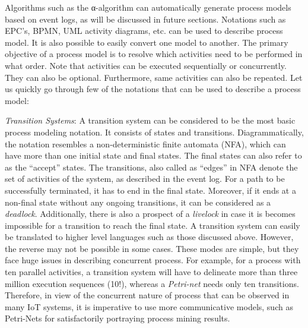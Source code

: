 Algorithms such as the α-algorithm can automatically generate process models based on event logs, as will be discussed in future sections. Notations such as EPC’s, BPMN, UML activity diagrams, etc. can be used to describe process model. It is also possible to easily convert one model to another. The primary objective of a process model is to resolve which activities need to be performed in what order. Note that activities can be executed sequentially or concurrently. They can also be optional. Furthermore, same activities can also be repeated. Let us quickly go through few of the notations that can be used to describe a process model\cite{VanderAalst2011}: 

\textit{Transition Systems}: A transition system can be considered to be the most basic process modeling notation. It consists of states and transitions. Diagrammatically, the notation resembles a non-deterministic finite automata (NFA), which can have more than one initial state and final states. The final states can also refer to as the “accept” states. The transitions, also called as “edges” in NFA denote the set of activities of the system, as described in the event log. For a path to be successfully terminated, it has to end in the final state. Moreover, if it ends at a non-final state without any ongoing transitions, it can be considered as a \textit{deadlock}. Additionally, there is also a prospect of a \textit{livelock} in case it is becomes impossible for a transition to reach the final state. A transition system can easily be translated to higher level languages such as those discussed above. However, the reverse may not be possible in some cases. These modes are simple, but they face huge issues in describing concurrent process. For example, for a process with ten parallel activities, a transition system will have to delineate more than three million execution sequences (10!), whereas a \textit{Petri-net} needs only ten transitions. Therefore, in view of the concurrent nature of process that can be observed in many IoT systems, it is imperative to use more communicative models, such as Petri-Nets for satisfactorily portraying process mining results.


